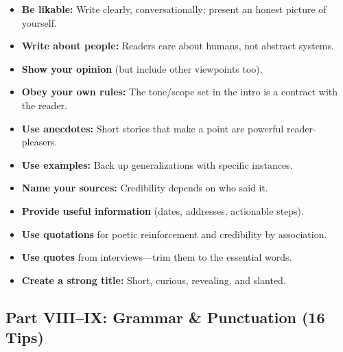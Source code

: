 \documentclass[12pt,a4paper]{article}
\begin{document}
\begin{itemize}[noitemsep]
    \item \textbf{Be likable:} Write clearly, conversationally; present an honest picture of yourself.
    \item \textbf{Write about people:} Readers care about humans, not abstract systems.
    \item \textbf{Show your opinion} (but include other viewpoints too).
    \item \textbf{Obey your own rules:} The tone/scope set in the intro is a contract with the reader.
    \item \textbf{Use anecdotes:} Short stories that make a point are powerful reader-pleasers.
    \item \textbf{Use examples:} Back up generalizations with specific instances.
    \item \textbf{Name your sources:} Credibility depends on who said it.
    \item \textbf{Provide useful information} (dates, addresses, actionable steps).
    \item \textbf{Use quotations} for poetic reinforcement and credibility by association.
    \item \textbf{Use quotes} from interviews---trim them to the essential words.
    \item \textbf{Create a strong title:} Short, curious, revealing, and slanted.
\end{itemize}

\subsection{Part VIII--IX: Grammar \& Punctuation (16 Tips)}
\end{document}
